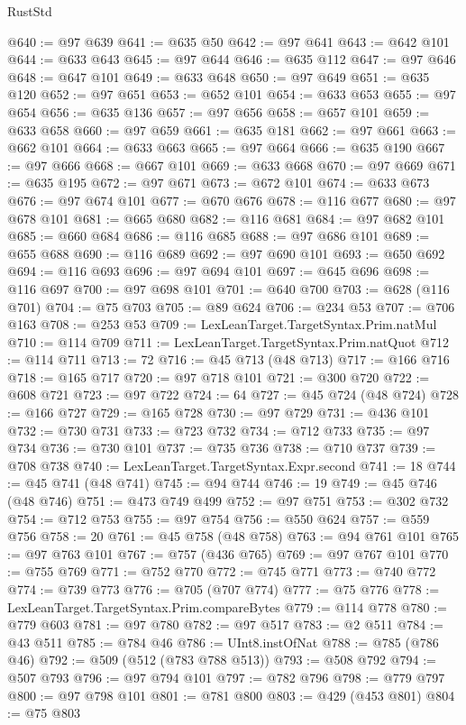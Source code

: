 \begin{lexlean}{RustStd}
\begin{coremodule}
@640 := @97 @639
@641 := @635 @50
@642 := @97 @641
@643 := @642 @101
@644 := @633 @643
@645 := @97 @644
@646 := @635 @112
@647 := @97 @646
@648 := @647 @101
@649 := @633 @648
@650 := @97 @649
@651 := @635 @120
@652 := @97 @651
@653 := @652 @101
@654 := @633 @653
@655 := @97 @654
@656 := @635 @136
@657 := @97 @656
@658 := @657 @101
@659 := @633 @658
@660 := @97 @659
@661 := @635 @181
@662 := @97 @661
@663 := @662 @101
@664 := @633 @663
@665 := @97 @664
@666 := @635 @190
@667 := @97 @666
@668 := @667 @101
@669 := @633 @668
@670 := @97 @669
@671 := @635 @195
@672 := @97 @671
@673 := @672 @101
@674 := @633 @673
@676 := @97 @674 @101
@677 := @670 @676
@678 := @116 @677
@680 := @97 @678 @101
@681 := @665 @680
@682 := @116 @681
@684 := @97 @682 @101
@685 := @660 @684
@686 := @116 @685
@688 := @97 @686 @101
@689 := @655 @688
@690 := @116 @689
@692 := @97 @690 @101
@693 := @650 @692
@694 := @116 @693
@696 := @97 @694 @101
@697 := @645 @696
@698 := @116 @697
@700 := @97 @698 @101
@701 := @640 @700
@703 := @628 (@116 @701)
@704 := @75 @703
@705 := @89 @624
@706 := @234 @53
@707 := @706 @163
@708 := @253 @53
@709 := LexLeanTarget.TargetSyntax.Prim.natMul
@710 := @114 @709
@711 := LexLeanTarget.TargetSyntax.Prim.natQuot
@712 := @114 @711
@713 := 72
@716 := @45 @713 (@48 @713)
@717 := @166 @716
@718 := @165 @717
@720 := @97 @718 @101
@721 := @300 @720
@722 := @608 @721
@723 := @97 @722
@724 := 64
@727 := @45 @724 (@48 @724)
@728 := @166 @727
@729 := @165 @728
@730 := @97 @729
@731 := @436 @101
@732 := @730 @731
@733 := @723 @732
@734 := @712 @733
@735 := @97 @734
@736 := @730 @101
@737 := @735 @736
@738 := @710 @737
@739 := @708 @738
@740 := LexLeanTarget.TargetSyntax.Expr.second
@741 := 18
@744 := @45 @741 (@48 @741)
@745 := @94 @744
@746 := 19
@749 := @45 @746 (@48 @746)
@751 := @473 @749 @499
@752 := @97 @751
@753 := @302 @732
@754 := @712 @753
@755 := @97 @754
@756 := @550 @624
@757 := @559 @756
@758 := 20
@761 := @45 @758 (@48 @758)
@763 := @94 @761 @101
@765 := @97 @763 @101
@767 := @757 (@436 @765)
@769 := @97 @767 @101
@770 := @755 @769
@771 := @752 @770
@772 := @745 @771
@773 := @740 @772
@774 := @739 @773
@776 := @705 (@707 @774)
@777 := @75 @776
@778 := LexLeanTarget.TargetSyntax.Prim.compareBytes
@779 := @114 @778
@780 := @779 @603
@781 := @97 @780
@782 := @97 @517
@783 := @2 @511
@784 := @43 @511
@785 := @784 @46
@786 := UInt8.instOfNat
@788 := @785 (@786 @46)
@792 := @509 (@512 (@783 @788 @513))
@793 := @508 @792
@794 := @507 @793
@796 := @97 @794 @101
@797 := @782 @796
@798 := @779 @797
@800 := @97 @798 @101
@801 := @781 @800
@803 := @429 (@453 @801)
@804 := @75 @803

\end{coremodule}
\end{lexlean}
